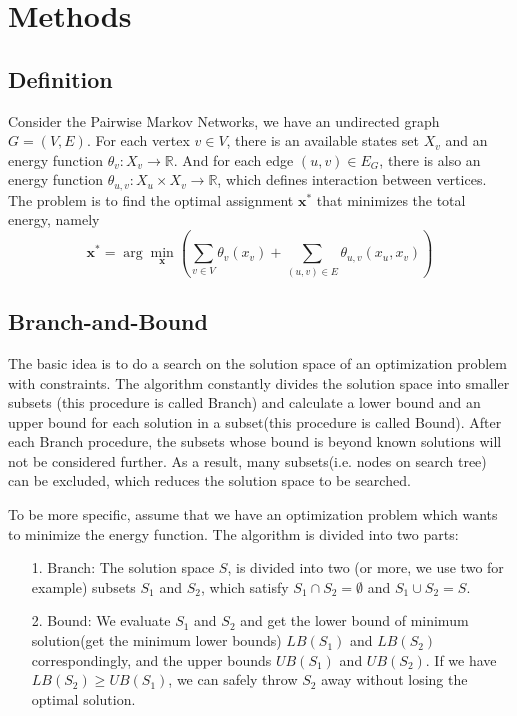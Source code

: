 \section{Methods}
\subsection{Definition}
Consider the Pairwise Markov Networks, we have an undirected graph $G=(V,E)$. For each vertex $v\in V$, there is an available states set $X_v$ and an energy function $\theta_v: X_v\rightarrow \mathbb{R}$. And for each edge $(u,v)\in E_G$, there is also an energy function $\theta_{u,v}:X_u\times X_v\rightarrow\mathbb{R}$, which defines interaction between vertices. The problem is to find the optimal assignment $\mathbf{x^*}$ that minimizes the total energy, namely
\[ \mathbf{x^*} = \arg\min_{\mathbf{x}}\left(\sum_{v\in V}\theta_v(x_v) + \sum_{(u,v)\in E}\theta_{u,v}(x_u,x_v)\right) \]

\subsection{Branch-and-Bound}
{\color{red}{Branch and Bound is a widely used search algorithm, which requires strong skills for solving different problems with it.}} The basic idea is to do a search on the solution space of an optimization problem with constraints. The algorithm constantly divides the solution space into smaller subsets (this procedure is called Branch) and calculate a lower bound and an upper bound for each solution in a subset(this procedure is called Bound). After each Branch procedure, the subsets whose bound is beyond known solutions will not be considered further. As a result, many subsets(i.e. nodes on search tree) can be excluded, which reduces the solution space to be searched.

To be more specific, assume that we have an optimization problem which wants to minimize the energy function. The algorithm is divided into two parts:
\begin{itemize}
\item[1.]Branch: The solution space $S${\color{red},} is divided into two (or more, we use two for example) subsets $S_1$ and $S_2$, which satisfy $S_1\cap S_2=\emptyset$ and $S_1\cup S_2=S$.
\item[2.]Bound: We evaluate $S_1$ and $S_2$ and get the lower bound of minimum solution{\color{red}(get the minimum lower bounds)} $LB(S_1)$ and $LB(S_2)$ correspondingly, and the upper bound{\color{red}s} $UB(S_1)$ and $UB(S_2)$. If we have $LB(S_2)\ge UB(S_1)$, we can safely throw $S_2$ away without losing the optimal solution.
\end{itemize}

